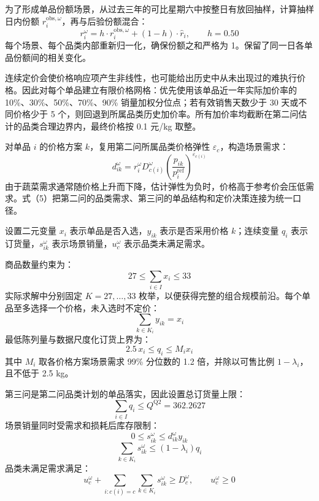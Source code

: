 \documentclass[withoutpreface,bwprint]{cumcmthesis} %
\numberwithin{equation}{section}
\begin{document}
为了形成单品份额场景，从过去三年的可比星期六中按整日有放回抽样，计算抽样日内份额 $r_i^{\mathrm{obs},\omega}$，再与后验份额混合：
\begin{equation}
    r_i^{\omega} = h \cdot r_i^{\mathrm{obs},\omega} + (1-h) \cdot \hat{r}_i,\qquad h = 0.50
\end{equation}
每个场景、每个品类内部重新归一化，确保份额之和严格为 1。保留了同一日各单品份额间的相关变化。

连续定价会使价格响应项产生非线性，也可能给出历史中从未出现过的难执行价格。因此对每个单品建立有限价格网格：优先使用该单品近一年实际加价率的 10\%、30\%、50\%、70\%、90\% 销量加权分位点；若有效销售天数少于 30 天或不同价格少于 5 个，则回退到所属品类历史加价率。所有加价率均截断在第二问估计的品类合理边界内，最终价格按 0.1 元/kg 取整。

对单品 $i$ 的价格方案 $k$，复用第二问所属品类价格弹性 $\varepsilon_c$，构造场景需求：
\begin{equation}
    d_{ik}^{\omega} = r_i^{\omega} D_{c(i)}^{\omega} \left(\frac{p_{ik}}{p_i^{\mathrm{ref}}}\right)^{\varepsilon_{c(i)}}
\end{equation}
由于蔬菜需求通常随价格上升而下降，估计弹性为负时，价格高于参考价会压低需求。式（5）把第二问的品类需求、第三问的单品结构和定价决策连接为统一口径。

设置二元变量 $x_i$ 表示单品是否入选，$y_{ik}$ 表示是否采用价格 $k$；连续变量 $q_i$ 表示订货量，$s_{ik}^{\omega}$ 表示场景销量，$u_c^{\omega}$ 表示品类未满足需求。

商品数量约束为：
\begin{equation}
    27 \leq \sum_{i\in I} x_i \leq 33
\end{equation}
实际求解中分别固定 $K=27,\ldots,33$ 枚举，以便获得完整的组合规模前沿。每个单品至多选择一个价格，未入选时不定价：
\begin{equation}
    \sum_{k\in K_i} y_{ik} = x_i
\end{equation}
最低陈列量与数据尺度化订货上界为：
\begin{equation}
    2.5\,x_i \leq q_i \leq M_i x_i
\end{equation}
其中 $M_i$ 取各价格方案场景需求 99\% 分位数的 1.2 倍，并除以可售比例 $1-\lambda_i$，且不低于 2.5 kg。

第三问是第二问品类计划的单品落实，因此设置总订货量上限：
\begin{equation}
    \sum_{i\in I} q_i \leq Q^{\mathrm{Q2}} = 362.2627
\end{equation}
场景销量同时受需求和损耗后库存限制：
\begin{equation}
    0 \leq s_{ik}^{\omega} \leq d_{ik}^{\omega} y_{ik}
\end{equation}
\begin{equation}
    \sum_{k\in K_i} s_{ik}^{\omega} \leq (1-\lambda_i) q_i
\end{equation}
品类未满足需求满足：
\begin{equation}
    u_c^{\omega} + \sum_{i:c(i)=c}\sum_{k\in K_i} s_{ik}^{\omega} \geq D_c^{\omega},\qquad u_c^{\omega} \geq 0
\end{equation}
\end{document}
